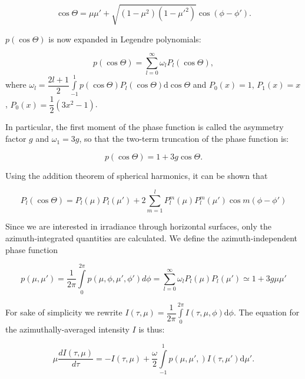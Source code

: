 \documentclass[a4paper,11pt]{article}
\begin{document}
\begin{equation}
\cos\Theta=\mu \mu' + \sqrt{(1-\mu^2)(1-\mu'^2)}\cos(\phi-\phi').
\end{equation}

\noindent $p(\cos\Theta)$ is now expanded in Legendre polynomials:

\begin{equation}
p(\cos\Theta)=\displaystyle\sum\limits_{l=0}^{\infty}\omega_l P_l(\cos\Theta),
\end{equation}
where $\omega_l=\dfrac{2l+1}{2}\displaystyle\int\limits_{-1}^{1}p(\cos\Theta) P_l(\cos\Theta)\mathrm{d}\cos\Theta$ and $P_0(x)=1$, $P_1(x)=x$, $P_0(x)=\dfrac{1}{2}(3x^2-1)$. 

In particular, the first moment of the phase function is called the asymmetry factor $g$ and $\omega_1=3g$, so that the two-term truncation of the phase function is:

\begin{equation}
\boxed{
p(\cos\Theta)=1+3g\cos\Theta.
}
\end{equation}

Using the addition theorem of spherical harmonics, it can be shown that

\begin{equation}
P_l(\cos\Theta)=P_l(\mu)P_l(\mu')+2\displaystyle\sum\limits_{m=1}^{l}P_l^m(\mu)P_l^m(\mu')\cos m(\phi-\phi')
\end{equation}

Since we are interested in irradiance through horizontal surfaces, only the azimuth-integrated quantities are calculated. We define the azimuth-independent phase function 

\begin{equation}
p(\mu,\mu')=\dfrac{1}{2\pi}\displaystyle\int\limits_{0}^{2\pi}p(\mu,\phi,\mu',\phi')d\phi = \displaystyle\sum\limits_{l=0}^{\infty}\omega_l P_l(\mu)P_l(\mu') \simeq 1+3g\mu\mu'
\label{azimuth}
\end{equation}

For sake of simplicity we rewrite $I(\tau,\mu)=\dfrac{1}{2\pi}\displaystyle\int\limits_{0}^{2\pi} I(\tau,\mu,\phi)\mathrm{d}\phi$. The equation for the azimuthally-averaged intensity $I$ is thus:

\begin{equation}
\boxed{
\mu\dfrac{dI(\tau,\mu)}{d\tau} =- I(\tau,\mu)+\dfrac{\omega}{2}\displaystyle\int\limits_{-1}^{1}p(\mu,\mu',)I(\tau,\mu') \mathrm{d} \mu'.
}
\label{RT_final}
\end{equation}
\end{document}
